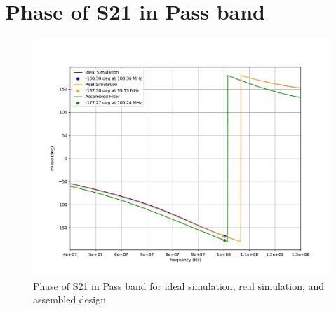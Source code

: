 \documentclass[letterpaper,12pt]{article}
\begin{document}
\section{Phase of S21 in Pass band}
\begin{figure}[H]
    \includegraphics[width=\linewidth]{figures/5.phase}
    \caption{Phase of S21 in Pass band for ideal simulation, real simulation, and assembled design}
\end{figure}

\newpage
\end{document}

